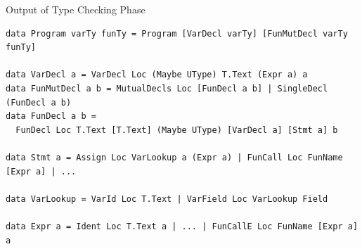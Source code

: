 \documentclass[dvipsnames,aspectratio=169]{beamer}
\begin{document}




\begin{frame}[fragile]{Output of Type Checking Phase}

  \begin{verbatim}
data Program varTy funTy = Program [VarDecl varTy] [FunMutDecl varTy funTy]

data VarDecl a = VarDecl Loc (Maybe UType) T.Text (Expr a) a
data FunMutDecl a b = MutualDecls Loc [FunDecl a b] | SingleDecl (FunDecl a b)
data FunDecl a b =
  FunDecl Loc T.Text [T.Text] (Maybe UType) [VarDecl a] [Stmt a] b

data Stmt a = Assign Loc VarLookup a (Expr a) | FunCall Loc FunName [Expr a] | ...

data VarLookup = VarId Loc T.Text | VarField Loc VarLookup Field

data Expr a = Ident Loc T.Text a | ... | FunCallE Loc FunName [Expr a] a
\end{verbatim}

\end{frame}

\end{document}

